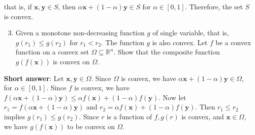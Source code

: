 that is, if \(\boldsymbol{x}, \boldsymbol{y} \in S\), then \(\alpha \boldsymbol{x}+(1-\alpha) \boldsymbol{y} \in S\) for \(\alpha \in[0,1]\). Therefore, the set \(S\) is convex.

\begin{enumerate}
	\setcounter{enumi}{2}
	\item Given a monotone non-decreasing function \(g\) of single variable, that is, \(g\left(r_{1}\right) \leq g\left(r_{2}\right)\) for \(r_{1}<r_{2}\). The function \(g\) is also convex. Let \(f\) be a convex function on a convex set \(\Omega \subseteq \mathbb{R}^{n}\). Show that the composite function \(g(f(\boldsymbol{x}))\) is convex on \(\Omega\).
\end{enumerate}

\textbf{Short answer}: Let \(\boldsymbol{x}, \boldsymbol{y} \in \Omega\). Since \(\Omega\) is convex, we have \(\alpha \boldsymbol{x}+(1-\alpha) \boldsymbol{y} \in \Omega\), for \(\alpha \in[0,1]\). Since \(f\) is convex, we have \(f(\alpha \boldsymbol{x}+(1-\alpha) \boldsymbol{y}) \leq \alpha f(\boldsymbol{x})+(1-\alpha) f(\boldsymbol{y})\). Now let \(r_{1}=f(\alpha \boldsymbol{x}+(1-\alpha) \boldsymbol{y})\) and \(r_{2}=\alpha f(\boldsymbol{x})+(1-\alpha) f(\boldsymbol{y})\). Then \(r_{1} \leq r_{2}\) implies \(g\left(r_{1}\right) \leq g\left(r_{2}\right)\). Since \(r\) is a function of \(f, g(r)\) is convex, and \(\boldsymbol{x} \in \Omega\), we have \(g(f(\boldsymbol{x}))\) to be convex on \(\Omega\).
